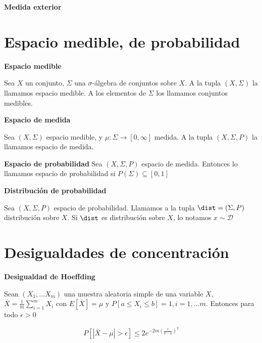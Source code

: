 \begin{definition} \textbf{Medida exterior}
 
\end{definition}




\section{Espacio medible, de probabilidad}

\begin{definition} \textbf{Espacio medible}

 Sea $X$ un conjunto, $\Sigma$ una $\sigma$-álgebra de conjuntos sobre $X$. A la tupla $(X,\Sigma)$ la llamamos
 espacio medible. A los elementos de $\Sigma$ los llamamos conjuntos medibles.
\end{definition}


\begin{definition} \textbf{Espacio de medida}

 Sea $(X, \Sigma)$ espacio medible, y $\mu: \Sigma \rightarrow [0,\infty]$ medida. A la tupla $(X, \Sigma, P)$ 
 la llamamos espacio de medida.
\end{definition}


\begin{definition} \textbf{Espacio de probabilidad}
 Sea $(X, \Sigma, P)$ espacio de medida. Entonces lo llamamos espacio de probabilidad si $P(\Sigma)\subseteq [0,1]$
\end{definition}


\begin{definition} \textbf{Distribución de probabilidad}

 Sea $(X, \Sigma, P)$ espacio de probabilidad. Llamamos a la tupla $\dist = (\Sigma,P)$ distribución sobre $X$. 
 Si $\dist$ es distribución sobre $X$, lo notamos $x\sim \mathcal{D}$
\end{definition}


\section{Desigualdades de concentración}
\begin{lemma} \textbf{Desigualdad de Hoeffding}

 Sean $(X_1, \ldots X_m)$ una muestra aleatoria simple de una variable $X$, 
 $\bar{X} = \frac{1}{m} \sum_{i=1}^m X_i$ con $E[\bar{X}] = \mu$ y $P[a \le X_i \le b] = 1, i=1, \ldots m$. 
 Entonces para todo $\epsilon > 0$

 \[P\left[\left| \bar{X} - \mu \right| > \epsilon \right] \le 2e^{-2m \left(\frac{\epsilon}{b-a}\right)^2}\]
\end{lemma}